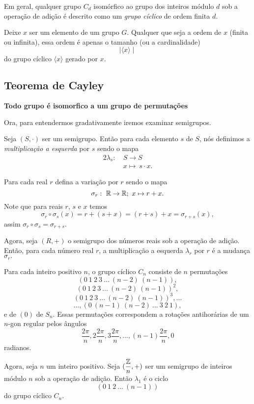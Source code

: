 Em geral, qualquer grupo $C_{d}$ isomórfico ao grupo dos inteiros módulo $d$ sob a operação de adição é descrito como um \emph{grupo cíclico} de ordem finita $d$.
\begin{stat}
  Deixe $x$ ser um elemento de um grupo $G$. Qualquer que seja a ordem de $x$ (finita ou infinita), essa ordem é apenas o tamanho (ou a cardinalidade) $$\mid \langle x \rangle \mid$$ do grupo cíclico $\langle x \rangle$ gerado por $x$. 
\end{stat}

\subsection{Teorema de Cayley}
\begin{center}
  \Large \color{red} \textbf{Todo grupo é isomorfico a um grupo de permutações}
\end{center}
Ora, para entendermos gradativamente iremos examinar semigrupos.

Seja $(S,\cdot)$ ser um semigrupo. Então para cada elemento $s$ de $S$, nós definimos a \emph{multiplicação a esquerda} por $s$ sendo o mapa  
\begin{alignat}{2}
  \lambda_{s}:\ &S \to S\nonumber\\
  &x \mapsto\ s \cdot x. \nonumber
\end{alignat}

\begin{exmp}
  Para cada real $r$ defina a variação por $r$ sendo o mapa $$\sigma_{r}:\ \mathbb{R} \to \mathbb{R};\ x \mapsto r + x.$$
  Note que para reais $r$, $s$ e $x$ temos $$\sigma_{r} \circ \sigma_{s} (x) = r + (s+x) = (r+s) + x = \sigma_{r+s}(x),$$ assim $\sigma_{r} \circ \sigma_{s} = \sigma_{r+s}$.

  Agora, seja $(R,+)$ o semigrupo dos números reais sob a operação de adição. Então, para cada número real $r$, a multiplicação a esquerda $\lambda_{r}$ por $r$ é a mudança $\sigma_{r}.$
\end{exmp}
\begin{exmp}
  Para cada inteiro positivo $n$, o grupo cíclico $C_{n}$ consiste de $n$ permutações $$\left(0\ 1\ 2\ 3\ ...\ (n-2)\ (n-1)\right),$$ $$\left(0\ 1\ 2\ 3\ ...\ (n-2)\ (n-1)\right)^{2},$$ $$\left(0\ 1\ 2\ 3\ ...\ (n-2)\ (n-1)\right)^{3}, ...$$ $$... ,\left(0\ (n-1)\ (n-2)\ ...\ 3\ 2\ 1\right),$$ e de $(0)$ de $S_{n}$. Essas permutações correspondem a rotações antihorárias de um $n$-gon regular pelos ângulos
  $$\dfrac{2\pi}{n}, 2\dfrac{2\pi}{n}, 3\dfrac{2\pi}{n}, ... , (n-1)\dfrac{2\pi}{n}, 0$$ radianos.

  Agora, seja $n$ um inteiro positivo. Seja $(\dfrac{\mathbb{Z}}{n}, +)$ ser um semigrupo de inteiros módulo $n$ sob a operação de adição. Então $\lambda_{1}$ é o ciclo $$(0\ 1\ 2\ ...\ (n-1))$$ do grupo cíclico $C_{n}$.
\end{exmp}


